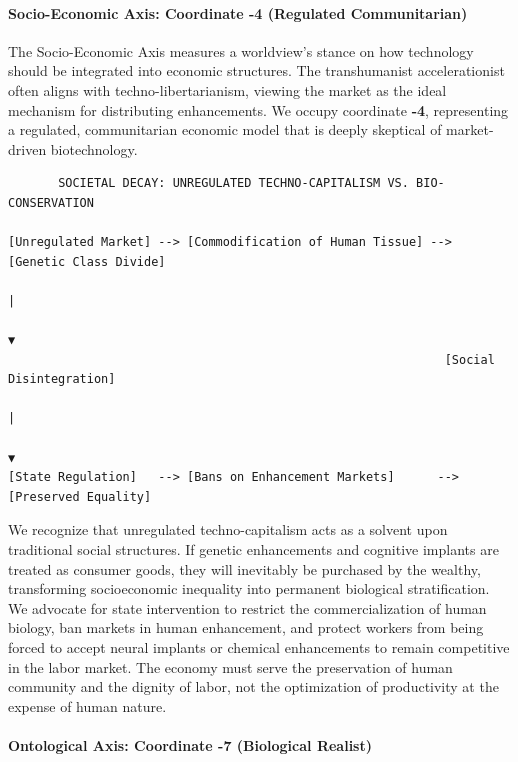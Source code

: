 \paragraph{Socio-Economic Axis: Coordinate -4 (Regulated
Communitarian)}\label{socio-economic-axis-coordinate--4-regulated-communitarian}

The Socio-Economic Axis measures a worldview's stance on how technology
should be integrated into economic structures. The transhumanist
accelerationist often aligns with techno-libertarianism, viewing the
market as the ideal mechanism for distributing enhancements. We occupy
coordinate \textbf{-4}, representing a regulated, communitarian economic
model that is deeply skeptical of market-driven biotechnology.

\begin{verbatim}
       SOCIETAL DECAY: UNREGULATED TECHNO-CAPITALISM VS. BIO-CONSERVATION

[Unregulated Market] --> [Commodification of Human Tissue] --> [Genetic Class Divide]
                                                                        |
                                                                        ▼
                                                             [Social Disintegration]
                                                                        |
                                                                        ▼
[State Regulation]   --> [Bans on Enhancement Markets]      --> [Preserved Equality]
\end{verbatim}

We recognize that unregulated techno-capitalism acts as a solvent upon
traditional social structures. If genetic enhancements and cognitive
implants are treated as consumer goods, they will inevitably be
purchased by the wealthy, transforming socioeconomic inequality into
permanent biological stratification. We advocate for state intervention
to restrict the commercialization of human biology, ban markets in human
enhancement, and protect workers from being forced to accept neural
implants or chemical enhancements to remain competitive in the labor
market. The economy must serve the preservation of human community and
the dignity of labor, not the optimization of productivity at the
expense of human nature.

\paragraph{Ontological Axis: Coordinate -7 (Biological
Realist)}\label{ontological-axis-coordinate--7-biological-realist}


